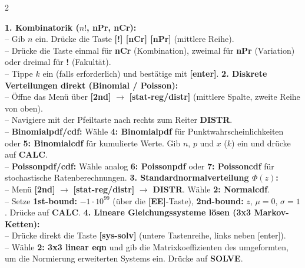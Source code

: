 \documentclass[a4paper, 9pt]{extarticle}
\begin{document}
\begin{multicols*}{2}
\begin{tcolorbox}[title={Klausur-Abkürzungen mit dem TI-30X Pro}, colframe=calcblack, colback=calcblack!5, colbacktitle=calcblack]
\textbf{1. Kombinatorik ($n!$, nPr, nCr):}
\\-- Gib $n$ ein. Drücke die Taste \textbf{[!] [nCr] [nPr]} (mittlere Reihe).
\\-- Drücke die Taste einmal für \textbf{nCr} (Kombination), zweimal für \textbf{nPr} (Variation) oder dreimal für \textbf{!} (Fakultät).
\\-- Tippe $k$ ein (falls erforderlich) und bestätige mit \textbf{[enter]}.
\smallskip
\textbf{2. Diskrete Verteilungen direkt (Binomial / Poisson):}
\\-- Öffne das Menü über \textbf{[2nd]} $\rightarrow$ \textbf{[stat-reg/distr]} (mittlere Spalte, zweite Reihe von oben).
\\-- Navigiere mit der Pfeiltaste nach rechts zum Reiter \textbf{DISTR}.
\\-- \textbf{Binomialpdf/cdf:} Wähle \textbf{4: Binomialpdf} für Punktwahrscheinlichkeiten oder \textbf{5: Binomialcdf} für kumulierte Werte. Gib $n$, $p$ und $x$ ($k$) ein und drücke auf \textbf{CALC}.
\\-- \textbf{Poissonpdf/cdf:} Wähle analog \textbf{6: Poissonpdf} oder \textbf{7: Poissoncdf} für stochastische Ratenberechnungen.
\smallskip
\textbf{3. Standardnormalverteilung $\Phi(z)$:}
\\-- Menü \textbf{[2nd]} $\rightarrow$ \textbf{[stat-reg/distr]} $\rightarrow$ \textbf{DISTR}. Wähle \textbf{2: Normalcdf}.
\\-- Setze \textbf{1st-bound:} $-1\cdot 10^{99}$ (über die \textbf{[EE]}-Taste), \textbf{2nd-bound:} $z$, $\mu = 0$, $\sigma = 1$. Drücke auf \textbf{CALC}.
\smallskip
\textbf{4. Lineare Gleichungssysteme lösen (3x3 Markov-Ketten):}
\\-- Drücke direkt die Taste \textbf{[sys-solv]} (untere Tastenreihe, links neben [enter]).
\\-- Wähle \textbf{2: 3x3 linear eqn} und gib die Matrixkoeffizienten des umgeformten, um die Normierung erweiterten Systems ein. Drücke auf \textbf{SOLVE}.
\end{tcolorbox}

\end{multicols*}
\end{document}
